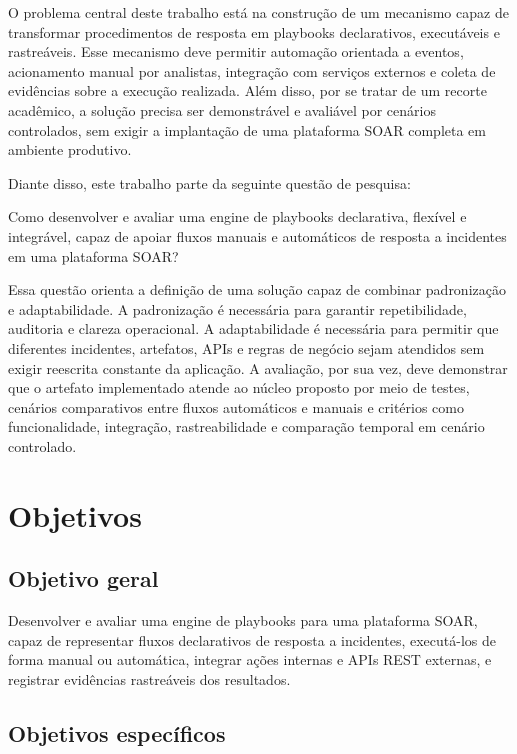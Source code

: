 \documentclass[article,a4paper,12pt,english,brazil,sumario=tradicional]{abntex2}
\renewenvironment{quotation}
  {\small\list{}{\rightmargin=0cm \leftmargin=2cm}%
   \item\relax}
  {\endlist}
\begin{document}
O problema central deste trabalho está na construção de um mecanismo capaz de transformar procedimentos de resposta em playbooks declarativos, executáveis e rastreáveis. Esse mecanismo deve permitir automação orientada a eventos, acionamento manual por analistas, integração com serviços externos e coleta de evidências sobre a execução realizada. Além disso, por se tratar de um recorte acadêmico, a solução precisa ser demonstrável e avaliável por cenários controlados, sem exigir a implantação de uma plataforma SOAR completa em ambiente produtivo.

Diante disso, este trabalho parte da seguinte questão de pesquisa:

\begin{quotation}
\noindent Como desenvolver e avaliar uma engine de playbooks declarativa, flexível e integrável, capaz de apoiar fluxos manuais e automáticos de resposta a incidentes em uma plataforma SOAR?
\end{quotation}

Essa questão orienta a definição de uma solução capaz de combinar padronização e adaptabilidade. A padronização é necessária para garantir repetibilidade, auditoria e clareza operacional. A adaptabilidade é necessária para permitir que diferentes incidentes, artefatos, APIs e regras de negócio sejam atendidos sem exigir reescrita constante da aplicação. A avaliação, por sua vez, deve demonstrar que o artefato implementado atende ao núcleo proposto por meio de testes, cenários comparativos entre fluxos automáticos e manuais e critérios como funcionalidade, integração, rastreabilidade e comparação temporal em cenário controlado.

\section{Objetivos}

\subsection{Objetivo geral}

Desenvolver e avaliar uma engine de playbooks para uma plataforma SOAR, capaz de representar fluxos declarativos de resposta a incidentes, executá-los de forma manual ou automática, integrar ações internas e APIs REST externas, e registrar evidências rastreáveis dos resultados.

\subsection{Objetivos específicos}
\end{document}
